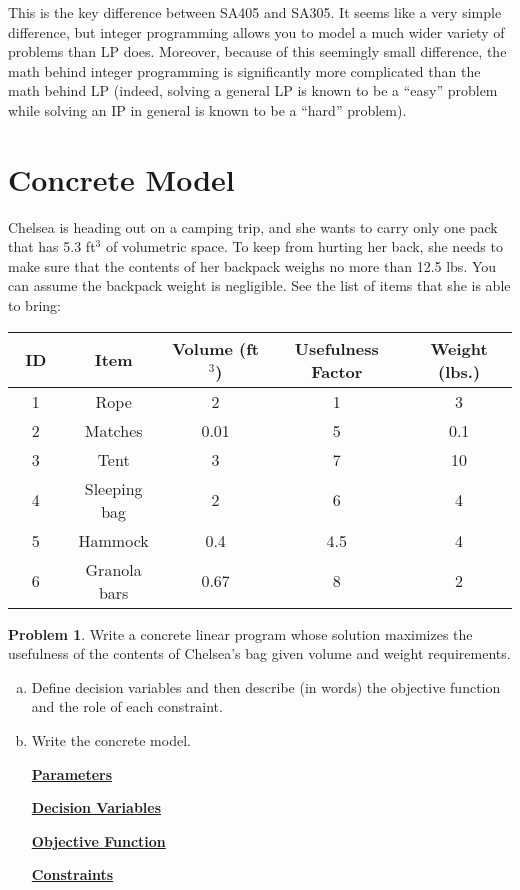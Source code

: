\documentclass[12pt]{article}
\theoremstyle{definition}
\newtheorem{problem}{Problem}
\begin{document}
\vspace{1.5in}
This is the key difference between SA405 and SA305. It seems like a very simple difference, but integer programming allows you to model a much wider variety of problems than LP does. Moreover, because of this seemingly small difference, the math behind integer programming is significantly more complicated than the math behind LP (indeed, solving a general LP is known to be a ``easy'' problem while solving an IP in general is known to be a ``hard'' problem).

\newpage


\section{Concrete Model}

Chelsea is heading out on a camping trip, and she wants to carry only one pack that has 5.3 ft$^3$ of volumetric space. To keep from hurting her back, she needs to make sure that the contents of her backpack weighs no more than 12.5 lbs. You can assume the backpack weight is negligible. See the list of items that she is able to bring:


\begin{center}
\begin{tabular}{|c|c |c| c| c|}
\hline
~ID~ & Item & Volume (ft$^3$) & Usefulness Factor & Weight (lbs.)\\ \hline
1 & Rope & 2 & 1 & 3 \\ \hline
2 & Matches & 0.01 & 5 & 0.1 \\  \hline
3 & Tent & 3 & 7 & 10   \\ \hline
4 & Sleeping bag & 2 & 6 & 4   \\ \hline
5 & Hammock & 0.4 & 4.5 & 4   \\ \hline
6 & Granola bars & 0.67 & 8 & 2   \\ \hline
\end{tabular}
\end{center}

\begin{problem}  Write a concrete linear program whose solution maximizes the usefulness of the contents of Chelsea's bag given volume and weight requirements.

\begin{enumerate}[a)]
\item Define decision variables and then describe (in words) the objective function and the role of each constraint. 

\pagebreak

\item Write the concrete model.

\textbf{\underline{Parameters}} \vspace{1in}

\textbf{\underline{Decision Variables}} \vspace{1.5in}

\textbf{\underline{Objective Function}} \vspace{1.5in}

\textbf{\underline{Constraints}}


\end{enumerate}
\end{problem}
\end{document}
